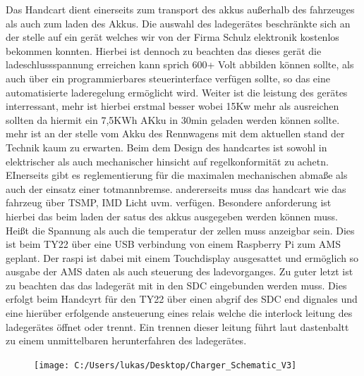 Das Handcart dient einerseits zum transport des akkus außerhalb des fahrzeuges als auch zum laden des Akkus. Die auswahl des ladegerätes beschränkte sich an der stelle auf ein gerät welches wir von der Firma Schulz elektronik kostenlos bekommen konnten. Hierbei ist dennoch zu beachten das dieses gerät die ladeschlussspannung erreichen kann sprich 600+ Volt abbilden können sollte, als auch über ein programmierbares steuerinterface verfügen sollte, so das eine automatisierte laderegelung ermöglicht wird. Weiter ist die leistung des gerätes interressant, mehr ist hierbei erstmal besser wobei 15Kw mehr als ausreichen sollten da hiermit ein 7,5KWh AKku in 30min geladen werden können sollte. mehr ist an der stelle vom Akku des Rennwagens mit dem aktuellen stand der Technik kaum zu erwarten. 
Beim dem Design des handcartes ist sowohl in elektrischer als auch mechanischer hinsicht auf regelkonformität zu achetn. EInerseits gibt es reglementierung für die maximalen mechanischen abmaße als auch der einsatz einer totmannbremse. andererseits muss das handcart wie das fahrzeug über TSMP, IMD Licht uvm. verfügen. Besondere anforderung ist hierbei das beim laden der satus des akkus ausgegeben werden können muss. Heißt die Spannung als auch die temperatur der zellen muss anzeigbar sein. Dies ist beim TY22 über eine USB verbindung von einem Raspberry Pi zum AMS geplant. Der raspi ist dabei mit einem Touchdisplay ausgesattet und ermöglich so ausgabe der AMS daten als auch steuerung des ladevorganges. Zu guter letzt ist zu beachten das das ladegerät mit in den SDC eingebunden werden muss. Dies erfolgt beim Handcyrt für den TY22 über einen abgrif des SDC end dignales und eine hierüber erfolgende ansteuerung eines relais welche die interlock leitung des ladegerätes öffnet oder trennt. Ein trennen dieser leitung führt laut dastenbaltt zu einem unmittelbaren herunterfahren des ladegerätes.

\begin{figure}
	\centering
	\texttt{[image: C:/Users/lukas/Desktop/Charger\_Schematic\_V3]}
	\caption{}
	\label{fig:chargerschematicv3}
\end{figure}


